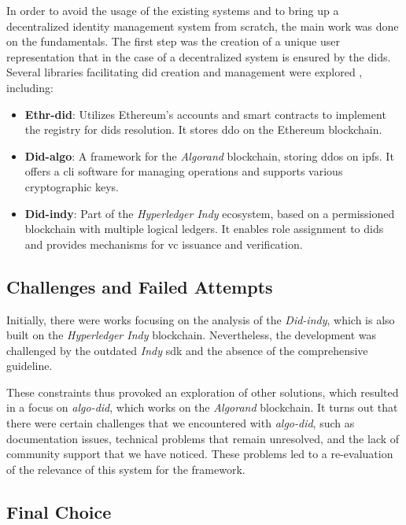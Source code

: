 In order to avoid the usage of the existing systems and to bring up a decentralized identity management system from scratch, the main work was done on the fundamentals. The 
first step was the creation of a unique user representation that in the case of a decentralized system is ensured by the \gls{did}s. Several libraries facilitating \gls{did} creation 
and management were explored \cite{10218198}, including:

\begin{itemize}
  \item \textbf{Ethr-did}: Utilizes Ethereum's accounts and smart contracts to implement the registry for \gls{did}s resolution. It stores \gls{ddo} on the Ethereum blockchain.
  \item \textbf{Did-algo}: A framework for the \textit{Algorand} blockchain, storing \gls{ddo}s on \gls{ipfs}. It offers a \gls{cli} software for managing operations and supports various 
  cryptographic keys.
  \item \textbf{Did-indy}: Part of the \textit{Hyperledger Indy} ecosystem, based on a permissioned blockchain with multiple logical ledgers. It enables role assignment to \gls{did}s and 
  provides mechanisms for \gls{vc} issuance and verification.
\end{itemize}

\subsection{Challenges and Failed Attempts}

Initially, there were works focusing on the analysis of the \textit{Did-indy}, which is also built on the \textit{Hyperledger Indy} blockchain. Nevertheless, the development was challenged 
by the outdated \textit{Indy} \gls{sdk} and the absence of the comprehensive guideline. 

These constraints thus provoked an exploration of other solutions, which resulted in a focus on \textit{algo-did}, which works on the \textit{Algorand} blockchain. It turns out that 
there were certain challenges that we encountered with \textit{algo-did}, such as documentation issues, technical problems that remain unresolved, and the lack of community 
support that we have noticed. These problems led to a re-evaluation of the relevance of this system for the framework.

\subsection{Final Choice}

